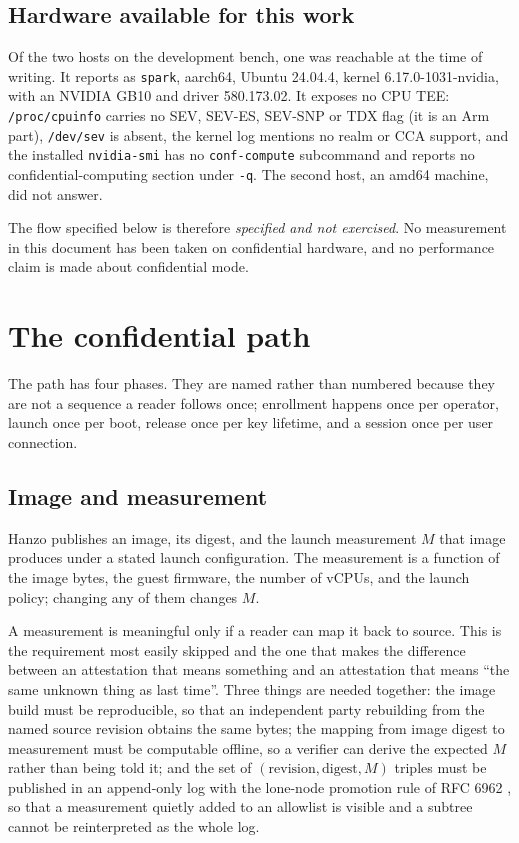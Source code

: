 \documentclass[11pt]{article}
\newcommand{\code}[1]{\texttt{#1}}
\begin{document}
\subsection{Hardware available for this work}

Of the two hosts on the development bench, one was reachable at the time of writing. It reports as
\code{spark}, aarch64, Ubuntu 24.04.4, kernel 6.17.0-1031-nvidia, with an NVIDIA GB10 and driver
580.173.02. It exposes no CPU TEE: \code{/proc/cpuinfo} carries no SEV, SEV-ES, SEV-SNP or TDX flag
(it is an Arm part), \code{/dev/sev} is absent, the kernel log mentions no realm or CCA support, and
the installed \code{nvidia-smi} has no \code{conf-compute} subcommand and reports no
confidential-computing section under \code{-q}. The second host, an amd64 machine, did not answer.

The flow specified below is therefore \emph{specified and not exercised}. No measurement in this
document has been taken on confidential hardware, and no performance claim is made about
confidential mode.

\section{The confidential path}
\label{sec:flow}

The path has four phases. They are named rather than numbered because they are not a sequence a
reader follows once; enrollment happens once per operator, launch once per boot, release once per
key lifetime, and a session once per user connection.

\subsection{Image and measurement}

Hanzo publishes an image, its digest, and the launch measurement $M$ that image produces under a
stated launch configuration. The measurement is a function of the image bytes, the guest firmware,
the number of vCPUs, and the launch policy; changing any of them changes $M$.

A measurement is meaningful only if a reader can map it back to source. This is the requirement most
easily skipped and the one that makes the difference between an attestation that means something and
an attestation that means ``the same unknown thing as last time''. Three things are needed together:
the image build must be reproducible, so that an independent party rebuilding from the named source
revision obtains the same bytes; the mapping from image digest to measurement must be computable
offline, so a verifier can derive the expected $M$ rather than being told it; and the set of
$(\text{revision}, \text{digest}, M)$ triples must be published in an append-only log with the
lone-node promotion rule of RFC 6962 \cite{rfc6962}, so that a measurement quietly added to an
allowlist is visible and a subtree cannot be reinterpreted as the whole log.
\end{document}
